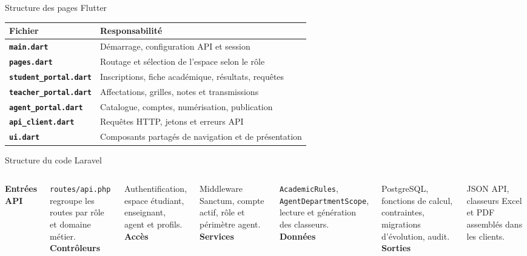 \documentclass[aspectratio=169,12pt]{beamer}
\begin{document}
\begin{frame}{Structure des pages Flutter}
  \scriptsize
  \begin{tabularx}{\textwidth}{@{}>{\bfseries}p{}X@{}}
    Fichier & Responsabilité\\\midrule
    \texttt{main.dart} & Démarrage, configuration API et session\\
    \texttt{pages.dart} & Routage et sélection de l’espace selon le rôle\\
    \texttt{student\_portal.dart} & Inscriptions, fiche académique, résultats, requêtes\\
    \texttt{teacher\_portal.dart} & Affectations, grilles, notes et transmissions\\
    \texttt{agent\_portal.dart} & Catalogue, comptes, numérisation, publication\\
    \texttt{api\_client.dart} & Requêtes HTTP, jetons et erreurs API\\
    \texttt{ui.dart} & Composants partagés de navigation et de présentation\\
  \end{tabularx}
\end{frame}

\begin{frame}{Structure du code Laravel}
  \begin{columns}[T,onlytextwidth]
      \textbf{Entrées API}\par
      \texttt{routes/api.php} regroupe les routes par rôle et domaine métier.\\[.7em]
      \textbf{Contrôleurs}\par
      Authentification, espace étudiant, enseignant, agent et profils.\\[.7em]
      \textbf{Accès}\par
      Middleware Sanctum, compte actif, rôle et périmètre agent.
      \textbf{Services}\par
      \texttt{AcademicRules}, \texttt{AgentDepartmentScope}, lecture et génération des classeurs.\\[.7em]
      \textbf{Données}\par
      PostgreSQL, fonctions de calcul, contraintes, migrations d’évolution, audit.\\[.7em]
      \textbf{Sorties}\par
      JSON API, classeurs Excel et PDF assemblés dans les clients.
  \end{columns}
\end{frame}
\end{document}
